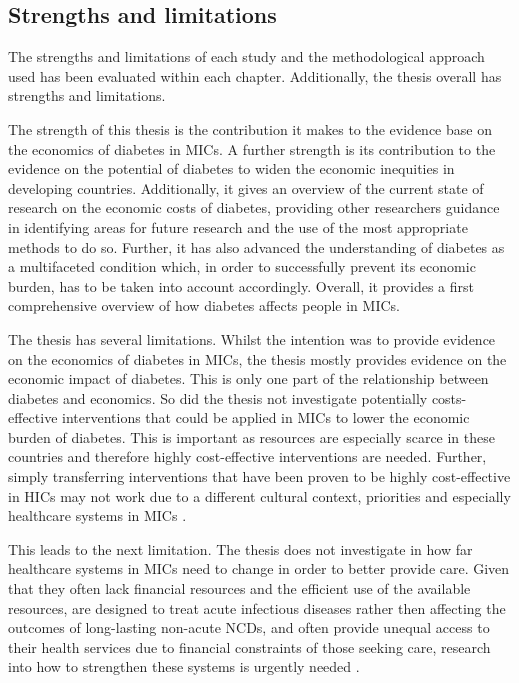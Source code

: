 \subsection{Strengths and limitations}

The strengths and limitations of each study and the methodological approach used has been evaluated within each chapter. Additionally, the thesis overall has strengths and limitations.

The strength of this thesis is the contribution it makes to the evidence base on the economics of diabetes in \acp{MIC}. A further strength is its contribution to the evidence on the potential of diabetes to widen the economic inequities in developing countries. Additionally, it gives an overview of the current state of research on the economic costs of diabetes, providing other researchers guidance in identifying areas for future research and the use of the most appropriate methods to do so. Further, it has also advanced the understanding of diabetes as a multifaceted condition which, in order to successfully prevent its economic burden, has to be taken into account accordingly. Overall, it provides a first comprehensive overview of how diabetes affects people in \acp{MIC}.

The thesis has several limitations. Whilst the intention was to provide evidence on the economics of diabetes in \acp{MIC}, the thesis mostly provides evidence on the economic impact of diabetes. This is only one part of the relationship between diabetes and economics. So did the thesis not investigate potentially costs-effective interventions that could be applied in \acp{MIC} to lower the economic burden of diabetes. This is important as resources are especially scarce in these countries and therefore highly cost-effective interventions are needed. Further, simply transferring interventions that have been proven to be highly cost-effective in \acp{HIC} may not work due to a different cultural context, priorities and especially healthcare systems in \acp{MIC} \parencite{Mills2014}.

This leads to the next limitation. The thesis does not investigate in how far healthcare systems in \acp{MIC} need to change in order to better provide care. Given that they often lack financial resources and the efficient use of the available resources, are designed to treat acute infectious diseases rather then affecting the outcomes of long-lasting non-acute \acp{NCD}, and often provide unequal access to their health services due to financial constraints of those seeking care, research into how to strengthen these systems is urgently needed \parencite{Mills2014,Guzman2010}.

